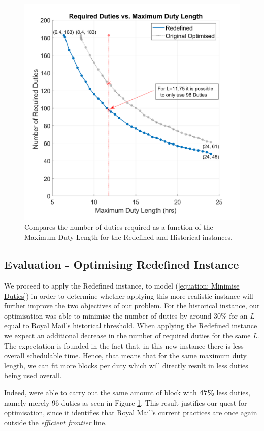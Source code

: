 \begin{figure}%
    \centering
    \includegraphics[width=0.46\linewidth]{[1] - chapter/Image Files/1-D2M2.png}
    \caption{Compares the number of duties required as a function of the Maximum Duty Length for the Redefined and Historical instances.}
    \label{fig:1-D2M2}
\end{figure}




\subsection*{Evaluation - Optimising Redefined Instance}
We proceed to apply the Redefined instance, to model (\ref{equation: Minimise Duties}) in order to determine whether applying this more realistic instance will further improve the two objectives of our problem. For the historical instance, our optimisation was able to minimise the number of duties by around 30\% for an \textit{L} equal to Royal Mail's historical threshold. When applying the Redefined instance we expect an additional decrease in the number of required duties for the same \textit{L}. The expectation is founded in the fact that, in this new instance there is less overall schedulable time. Hence, that means that for the same maximum duty length, we can fit more blocks per duty which will directly result in less duties being used overall. 

\vspace{\baselineskip}
\noindent
Indeed, were able to carry out the same amount of block with \textbf{47\%} less duties, namely merely 96 duties as seen in Figure \ref{fig:1-D2M2}. This result justifies our quest for optimisation, since it identifies that Royal Mail's current practices are once again outside the \textit{efficient frontier} line. 

